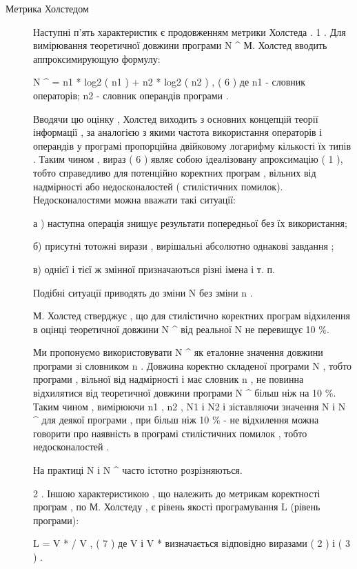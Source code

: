 \documentclass[oneside,final,14pt]{extreport}
\begin{document}
\begin{description}
\item[{Метрика Холстедом}] \leavevmode
Наступні п'ять характеристик є продовженням метрики Холстеда .
1 . Для вимірювання теоретичної довжини програми N \textasciicircum{} М. Холстед вводить аппроксимирующую формулу:

N \textasciicircum{} = n1 * log2 ( n1 ) + n2 * log2 ( n2 ) , ( 6 )
де n1 - словник операторів; n2 - словник операндів програми .

Вводячи цю оцінку , Холстед виходить з основних концепцій теорії інформації , за аналогією з якими частота використання операторів і операндів у програмі пропорційна двійковому логарифму кількості їх типів . Таким чином , вираз ( 6 ) являє собою ідеалізовану апроксимацію ( 1 ), тобто справедливо для потенційно коректних програм , вільних від надмірності або недосконалостей ( стилістичних помилок). Недосконалостями можна вважати такі ситуації:

а ) наступна операція знищує результати попередньої без їх використання;

б) присутні тотожні вирази , вирішальні абсолютно однакові завдання ;

в) однієї і тієї ж змінної призначаються різні імена і т. п.

Подібні ситуації приводять до зміни N без зміни n .

М. Холстед стверджує , що для стилістично коректних програм відхилення в оцінці теоретичної довжини N \textasciicircum{} від реальної N не перевищує 10 \%.

Ми пропонуємо використовувати N \textasciicircum{} як еталонне значення довжини програми зі словником n . Довжина коректно складеної програми N , тобто програми , вільної від надмірності і має словник n , не повинна відхилятися від теоретичної довжини програми N \textasciicircum{} більш ніж на 10 \%. Таким чином , вимірюючи n1 , n2 , N1 і N2 і зіставляючи значення N і N \textasciicircum{} для деякої програми , при більш ніж 10 \% - не відхилення можна говорити про наявність в програмі стилістичних помилок , тобто недосконалостей .

На практиці N і N \textasciicircum{} часто істотно розрізняються.

2 . Іншою характеристикою , що належить до метрикам коректності програм , по М. Холстеду , є рівень якості програмування L (рівень програми):

L = V * / V , ( 7 )
де V і V * визначається відповідно виразами ( 2 ) і ( 3 ) .


\end{description}
\end{document}
